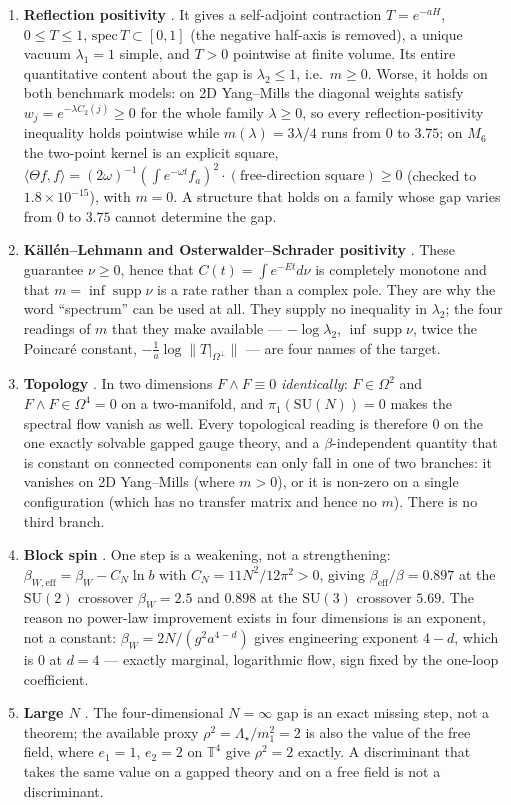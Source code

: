\begin{enumerate}[label=(\roman*)]
\item \textbf{Reflection positivity} \LT. It gives a self-adjoint contraction $T=e^{-aH}$,
  $0\le T\le1$, $\mathrm{spec}\,T\subset[0,1]$ (the negative half-axis is removed), a unique vacuum
  $\lambda_1=1$ simple, and $T>0$ pointwise at finite volume. Its entire quantitative content about
  the gap is $\lambda_2\le1$, i.e.\ $m\ge0$. Worse, it holds on both benchmark models: on 2D
  Yang--Mills the diagonal weights satisfy $w_j=e^{-\lambda C_2(j)}\ge0$ for the whole family
  $\lambda\ge0$, so every reflection-positivity inequality holds pointwise while $m(\lambda)=3\lambda/4$
  runs from $0$ to $3.75$; on $M_6$ the two-point kernel is an explicit square,
  $\langle\Theta f,f\rangle=(2\omega)^{-1}(\int e^{-\omega t}f_a)^2\cdot(\text{free-direction square})\ge0$
  (checked to $1.8\times10^{-15}$), with $m=0$. A structure that holds on a family whose gap varies
  from $0$ to $3.75$ cannot determine the gap.
\item \textbf{K\"all\'en--Lehmann and Osterwalder--Schrader positivity} \LT. These guarantee
  $\nu\ge0$, hence that $C(t)=\int e^{-Et}d\nu$ is completely monotone and that
  $m=\inf\operatorname{supp}\nu$ is a rate rather than a complex pole. They are why the word
  ``spectrum'' can be used at all. They supply no inequality in $\lambda_2$; the four readings of
  $m$ that they make available --- $-\log\lambda_2$, $\inf\operatorname{supp}\nu$, twice the
  Poincar\'e constant, $-\frac1a\log\|T|_{\Omega^\perp}\|$ --- are four names of the target.
\item \textbf{Topology} \LN. In two dimensions $F\wedge F\equiv0$ \emph{identically}: $F\in\Omega^2$
  and $F\wedge F\in\Omega^4=0$ on a two-manifold, and $\pi_1(\mathrm{SU}(N))=0$ makes the spectral
  flow vanish as well. Every topological reading is therefore $0$ on the one exactly solvable gapped
  gauge theory, and a $\beta$-independent quantity that is constant on connected components can only
  fall in one of two branches: it vanishes on 2D Yang--Mills (where $m>0$), or it is non-zero on a
  single configuration (which has no transfer matrix and hence no $m$). There is no third branch.
\item \textbf{Block spin} \LN. One step is a weakening, not a strengthening:
  $\beta_{W,\mathrm{eff}}=\beta_W-C_N\ln b$ with $C_N=11N^2/12\pi^2>0$, giving
  $\beta_{\mathrm{eff}}/\beta=0.897$ at the $\mathrm{SU}(2)$ crossover $\beta_W=2.5$ and $0.898$ at
  the $\mathrm{SU}(3)$ crossover $5.69$. The reason no power-law improvement exists in four
  dimensions is an exponent, not a constant: $\beta_W=2N/(g^2a^{4-d})$ gives engineering exponent
  $4-d$, which is $0$ at $d=4$ --- exactly marginal, logarithmic flow, sign fixed by the one-loop
  coefficient.
\item \textbf{Large $N$} \LN. The four-dimensional $N=\infty$ gap is an exact missing step, not a
  theorem; the available proxy $\rho^2=\Lambda_\star/m_1^2=2$ is also the value of the free field,
  where $e_1=1$, $e_2=2$ on $\mathbb T^4$ give $\rho^2=2$ exactly. A discriminant that takes the
  same value on a gapped theory and on a free field is not a discriminant.
\end{enumerate}

